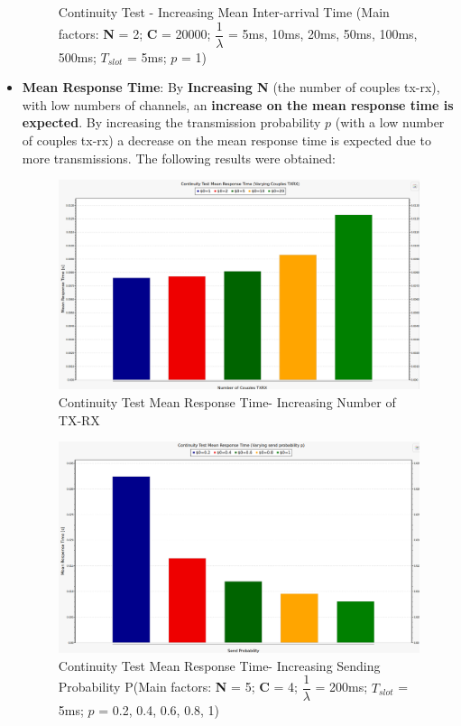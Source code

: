 \begin{itemize}
\begin{figure}[H]
		\caption{Continuity Test - Increasing Mean Inter-arrival Time (Main factors: \textbf{N} = 2; \textbf{C} = 20000; $\dfrac{1}{\lambda}$ = 5ms, 10ms, 20ms, 50ms, 100ms, 500ms; $T_{slot}$ = 5ms; $p$ = 1)}
		\label {img: continuityTestThLambda}
	\end{figure}
	\item \textbf{Mean Response Time}: By \textbf{Increasing N} (the number of couples tx-rx), with low numbers of channels, an \textbf{increase on the mean response time is expected}. By increasing the transmission probability $p$ (with a low number of couples tx-rx) a decrease on the mean response time is expected due to more transmissions. The following results were obtained:
	\begin{figure}[H]
		\centering
		\includegraphics[width=\textwidth]{img/ContinuityTest_ResponseTIme_TXRXVarying}
		\caption{Continuity Test Mean Response Time- Increasing Number of TX-RX}
		\label {img: continuityTestTXRXResponse}
	\end{figure}
	\begin{figure}[H]
		\centering
		\includegraphics[width=\textwidth]{img/ContinuityTest_ResponseTIme_VaryingP.png}
		\caption{Continuity Test Mean Response Time- Increasing Sending Probability P(Main factors: \textbf{N} = 5; \textbf{C} = 4; $\dfrac{1}{\lambda}$ = 200ms; $T_{slot}$ = 5ms; $p$ = 0.2, 0.4, 0.6, 0.8, 1)}
		\label {img: continuityTestResponseLambda}
	\end{figure}
\end{itemize} 
